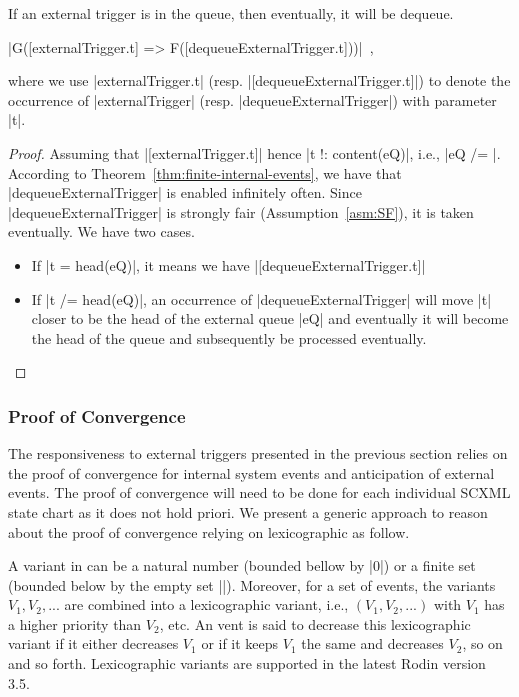 \begin{theorem}
  \label{thm:resp-ext-trg}
  If an external trigger is in the queue, then eventually, it will be dequeue.
  \begin{center}
    |G([externalTrigger.t] => F([dequeueExternalTrigger.t]))|~,
  \end{center}
  where we use |externalTrigger.t|
  (resp. |[dequeueExternalTrigger.t]|) to denote the occurrence of
  |externalTrigger| (resp. |dequeueExternalTrigger|) with parameter |t|.
\end{theorem}
\begin{proof}
  Assuming that |[externalTrigger.t]| hence |t !: content(eQ)|, i.e.,
  |eQ /= {}|.  According to Theorem~\ref{thm:finite-internal-events},
  we have that |dequeueExternalTrigger| is enabled infinitely often.
  Since |dequeueExternalTrigger| is strongly fair
  (Assumption~\ref{asm:SF}), it is taken eventually. We have two
  cases.
  \begin{itemize}
  \item If |t = head(eQ)|, it means we have
    |[dequeueExternalTrigger.t]|
    
  \item If |t /= head(eQ)|, an occurrence of |dequeueExternalTrigger|
    will move |t| closer to be the head of the external queue |eQ| and
    eventually it will become the head of the queue and subsequently
    be processed eventually.
  \end{itemize}
\end{proof}

\subsubsection{Proof of Convergence}
\label{sec:proof-convergence}
The responsiveness to external triggers presented in the previous
section relies on the proof of convergence for internal system events
and anticipation of external events. The proof of convergence will
need to be done for each individual SCXML state chart as it does not
hold priori.  We present a generic approach to reason about the proof
of convergence relying on lexicographic as follow.

A variant in \EventB can be a natural number (bounded bellow by |0|)
or a finite set (bounded below by the empty set |{}|).  Moreover, for
a set of events, the variants $V_1, V_2, ...$ are combined into a
lexicographic variant, i.e., $(V_1, V_2, ...)$ with $V_1$ has a higher
priority than $V_2$, etc. An vent is said to decrease this
lexicographic variant if it either decreases $V_1$ or if it keeps
$V_1$ the same and decreases $V_2$, so on and so forth.  Lexicographic
variants are supported in the latest Rodin version 3.5.

